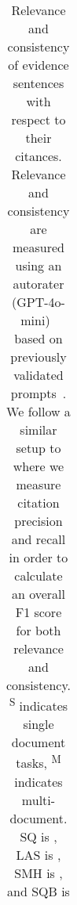 \begin{table}[t]
\begin{tabular}{l c c | c c | c c | c c}
    \end{tabular}
    \caption{Relevance and consistency of evidence sentences with respect to their citances. Relevance and consistency are measured using an autorater (GPT-4o-mini)~\cite{DBLP:conf/emnlp/LiuIXWXZ23} based on previously validated prompts~\cite{DBLP:journals/corr/abs-2410-23463}. 
    We follow a similar setup to \cite{DBLP:conf/emnlp/LabanFXW24,openscholar} where we measure citation precision and recall in order to calculate an overall F1 score for both relevance and consistency. 
    \textsuperscript{S} indicates single document tasks, \textsuperscript{M} indicates multi-document. SQ is \sqa{}, LAS is \las{}, SMH is \smh{}, and SQB is \ops{}}
    \label{tab:retrieval_results}
\end{table}
